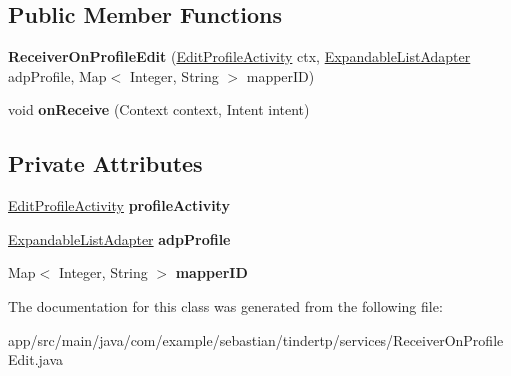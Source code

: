 \subsection*{Public Member Functions}
\begin{DoxyCompactItemize}
\item 
{\bfseries Receiver\+On\+Profile\+Edit} (\hyperlink{classcom_1_1example_1_1sebastian_1_1tindertp_1_1EditProfileActivity}{Edit\+Profile\+Activity} ctx, \hyperlink{classcom_1_1example_1_1sebastian_1_1tindertp_1_1ExpandedListAdapters_1_1ExpandableListAdapter}{Expandable\+List\+Adapter} adp\+Profile, Map$<$ Integer, String $>$ mapper\+ID)\hypertarget{classcom_1_1example_1_1sebastian_1_1tindertp_1_1services_1_1ReceiverOnProfileEdit_addf3c0ee92f912ac0227fc5437a80c5a}{}\label{classcom_1_1example_1_1sebastian_1_1tindertp_1_1services_1_1ReceiverOnProfileEdit_addf3c0ee92f912ac0227fc5437a80c5a}

\item 
void {\bfseries on\+Receive} (Context context, Intent intent)\hypertarget{classcom_1_1example_1_1sebastian_1_1tindertp_1_1services_1_1ReceiverOnProfileEdit_af526e15648381f6e0aa2ba5e14760c5d}{}\label{classcom_1_1example_1_1sebastian_1_1tindertp_1_1services_1_1ReceiverOnProfileEdit_af526e15648381f6e0aa2ba5e14760c5d}

\end{DoxyCompactItemize}
\subsection*{Private Attributes}
\begin{DoxyCompactItemize}
\item 
\hyperlink{classcom_1_1example_1_1sebastian_1_1tindertp_1_1EditProfileActivity}{Edit\+Profile\+Activity} {\bfseries profile\+Activity}\hypertarget{classcom_1_1example_1_1sebastian_1_1tindertp_1_1services_1_1ReceiverOnProfileEdit_a2528aa8d62a64623894fe0d5cae11151}{}\label{classcom_1_1example_1_1sebastian_1_1tindertp_1_1services_1_1ReceiverOnProfileEdit_a2528aa8d62a64623894fe0d5cae11151}

\item 
\hyperlink{classcom_1_1example_1_1sebastian_1_1tindertp_1_1ExpandedListAdapters_1_1ExpandableListAdapter}{Expandable\+List\+Adapter} {\bfseries adp\+Profile}\hypertarget{classcom_1_1example_1_1sebastian_1_1tindertp_1_1services_1_1ReceiverOnProfileEdit_a62af02081bd01fe81d04059f3cca4e66}{}\label{classcom_1_1example_1_1sebastian_1_1tindertp_1_1services_1_1ReceiverOnProfileEdit_a62af02081bd01fe81d04059f3cca4e66}

\item 
Map$<$ Integer, String $>$ {\bfseries mapper\+ID}\hypertarget{classcom_1_1example_1_1sebastian_1_1tindertp_1_1services_1_1ReceiverOnProfileEdit_a5a1a7eb3e3ad383dff46ff7971ace2cd}{}\label{classcom_1_1example_1_1sebastian_1_1tindertp_1_1services_1_1ReceiverOnProfileEdit_a5a1a7eb3e3ad383dff46ff7971ace2cd}

\end{DoxyCompactItemize}


The documentation for this class was generated from the following file\+:\begin{DoxyCompactItemize}
\item 
app/src/main/java/com/example/sebastian/tindertp/services/Receiver\+On\+Profile\+Edit.\+java\end{DoxyCompactItemize}
